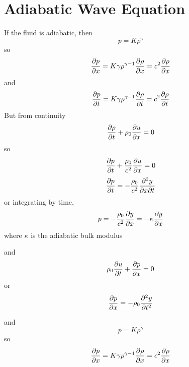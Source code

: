 \documentclass[11pt, oneside]{article}   	%
\begin{document}
\section {Adiabatic Wave Equation}
If the fluid is adiabatic, then
$$p=K\rho^\gamma$$
so $${\partial p\over \partial x}=K\gamma \rho^{\gamma-1}{\partial \rho\over \partial x}=c^2{\partial \rho\over \partial x}$$
and $${\partial p\over \partial t}=K\gamma \rho^{\gamma-1}{\partial \rho\over \partial t}=c^2{\partial \rho\over \partial t}$$
But from continuity
$$ {\partial  \rho \over \partial t} + \rho_0{\partial  u \over \partial x}=0$$
so
$$ {\partial  p \over \partial t} + {\rho_0 \over c^2}{\partial  u \over \partial x}=0$$
$$ {\partial  p \over \partial t} =- {\rho_0 \over c^2}{\partial^2  y \over \partial x\partial t}$$
or integrating by time,
$$ p  =- {\rho_0 \over c^2}{\partial  y \over \partial x} =- {\kappa}{\partial  y \over \partial x}$$
where $\kappa$ is the adiabatic bulk modulus


and
$$\rho_0 {\partial  u \over \partial t}+{\partial p\over \partial x} = 0$$
or
$${\partial p\over \partial x} = -\rho_0 {\partial^2  y \over \partial t^2}$$

and $$p=K\rho^\gamma$$
so $${\partial p\over \partial x}=K\gamma \rho^{\gamma-1}{\partial \rho\over \partial x}=c^2{\partial \rho\over \partial x}$$
\end{document}
